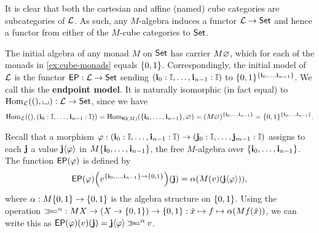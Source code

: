 \documentclass[a4paper]{memoir}
\begin{document}
It is clear that both the cartesian and affine (named) cube categories are subcategories of $\catL$.
As such, any $M$-algebra induces a functor $\catL \to \Set$ and hence a functor from either of the $M$-cube categories to $\Set$.

The initial algebra of any monad $M$ on $\Set$ has carrier $M \eset$, which for each of the monads in \cref{ex:cube-monads} equals $\accol{0, 1}$.
Correspondingly, the initial model of $\catL$ is the functor $\EP : \catL \to \Set$ sending $(\dm{i}_0 : \IX, \ldots, \dm{i}_{n-1} : \IX)$ to $\accol{0, 1}^{\accol{\dm{i}_0, \ldots, \dm{i}_{n-1}}}$.
We call this the \textbf{endpoint model}.
It is naturally isomorphic (in fact equal) to $\Hom_\catL((), \loch) : \catL \to \Set$, since we have
\small \[
	\Hom_\catL((), (\dm{i}_0 : \IX, \ldots, \dm{i}_{n-1} : \IX))
	= \Hom_{\Kleisli(M)}(\accol{\dm{i}_0, \ldots, \dm{i}_{n-1}}, \eset)
	= (M\eset)^{\accol{\dm{i}_0, \ldots, \dm{i}_{n-1}}}
	= \accol{0, 1}^{\accol{\dm{i}_0, \ldots, \dm{i}_{n-1}}}.
\] \normalsize


Recall that a morphism $\vfi : (\dm{i}_0 : \IX, \ldots, \dm{i}_{n-1} : \IX) \to (\dm{j}_0 : \IX, \ldots, \dm{j}_{m-1} : \IX)$ assigns to each $\dm j$ a value $\dm j\psub \vfi$ in $M \accol{\dm{i}_0, \ldots, \dm{i}_{n-1}}$, the free $M$-algebra over $\accol{\dm{i}_0, \ldots, \dm{i}_{n-1}}$.
The function $\EP(\vfi)$ is defined by
\[
	\EP(\vfi)
	\paren{ v^{\accol{\dm{i}_0, \ldots, \dm{i}_{n-1}} \to \accol{0, 1}} }
	(\dm j)
	= \alpha\paren{ M(v)(\dm j \psub \vfi) },
\]
where $\alpha : M\accol{0, 1} \to \accol{0, 1}$ is the algebra structure on $\accol{0, 1}$.
Using the operation $\bindop^\alpha : MX \to (X \to \accol{0, 1}) \to \accol{0, 1} : \hat x \mapsto f \mapsto \alpha (Mf(\hat x))$, we can write this as $\EP(\vfi)(v)(\dm j) = \dm j \psub \vfi \bindop^\alpha v$.
\end{document}
